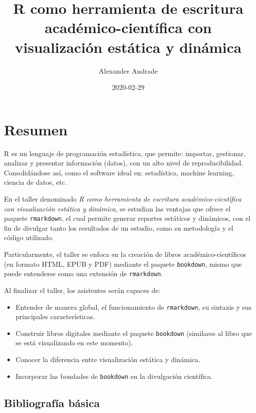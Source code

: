 \documentclass[
]{book}
\title{R como herramienta de escritura académico-científica con visualización estática y dinámica}
\author{Alexander Andrade}
\date{2020-02-29}
\providecommand{\tightlist}{%
  \setlength{\itemsep}{0pt}\setlength{\parskip}{0pt}}
\begin{document}
\frontmatter
\maketitle

{
\setcounter{tocdepth}{1}
\tableofcontents
}
\mainmatter
\hypertarget{resumen}{%
\chapter{Resumen}\label{resumen}}

R es un lenguaje de programación estadística, que permite: importar, gestionar, analizar y presentar información (datos), con un alto nivel de reproducibilidad. Consolidándose así, como el software ideal en: estadística, machine learning, ciencia de datos, etc.

En el taller denominado \emph{R como herramienta de escritura académico-científica con visualización estática y dinámica}, se estudian las ventajas que ofrece el paquete \texttt{rmarkdown}, el cual permite generar reportes estáticos y dinámicos, con el fin de divulgar tanto los resultados de un estudio, como su metodología y el código utilizado.

Particularmente, el taller se enfoca en la creación de libros académico-científicos (en formato HTML, EPUB y PDF) mediante el paquete \texttt{bookdown}, mismo que puede entenderse como una extensión de \texttt{rmarkdown}.

Al finalizar el taller, los asistentes serán capaces de:

\begin{itemize}
\tightlist
\item
  Entender de manera global, el funcionamiento de \texttt{rmarkdown}, su sintaxis y sus principales características.
\item
  Construir libros digitales mediante el paquete \texttt{bookdown} (similares al libro que se está visualizando en este momento).
\item
  Conocer la diferencia entre visualización estática y dinámica.
\item
  Incorporar las bondades de \texttt{bookdown} en la divulgación científica.
\end{itemize}

\hypertarget{bibliografuxeda-buxe1sica}{%
\section*{Bibliografía básica}\label{bibliografuxeda-buxe1sica}}
\end{document}
